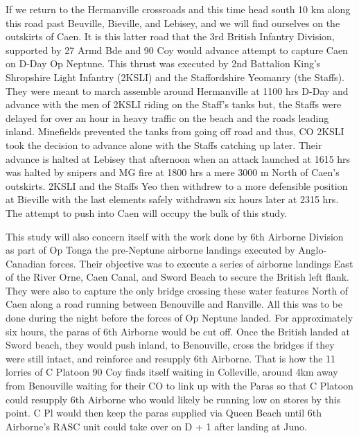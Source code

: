 \documentclass[noraggedright]{turabian-researchpaper}
\begin{document}
If we return to the Hermanville crossroads and this time head south 
10 km along this road past Beuville, Bieville, and Lebisey, and we will find 
ourselves on the outskirts of Caen.  It is this latter road that the 3rd 
British Infantry Division, supported by 27 Armd Bde and 90 Coy would advance
attempt to capture Caen on D-Day Op Neptune.  This thrust was executed by 
2nd Battalion King's Shropshire Light Infantry (2KSLI) and the Staffordshire
Yeomanry (the Staffs).  They were meant to march assemble around Hermanville
at 1100 hrs D-Day and advance with the men of 2KSLI riding on the Staff's 
tanks but, the Staffs were delayed for over an hour in heavy traffic on the
beach and the roads leading inland.  Minefields prevented the tanks from
going off road and thus, CO 2KSLI took the decision to advance alone with the
Staffs catching up later.\autocite[1100 -- 1230 hrs 6 June 1944]{2KSLIwd}
Their advance is halted at Lebisey that afternoon when an attack launched at 
1615 hrs was halted by snipers and MG fire at 1800 hrs a mere 3000 m North of 
Caen's outskirts.  2KSLI and the Staffs Yeo then withdrew to a more 
defensible position at Bieville with the last elements safely withdrawn
six hours later at 2315 hrs.\autocites[6 June 1944]{staffswd}[1630 -- 2315]
{2KSLIwd} The attempt to push into Caen will occupy the bulk of this study.

This study will also concern itself with the work done by 6th Airborne
Division as part of Op Tonga the pre-Neptune airborne landings executed
by Anglo-Canadian forces.  Their objective was to execute a series of
airborne landings East of the River Orne, Caen Canal, and Sword Beach to 
secure the British left flank.  They were also to capture the only bridge 
crossing
these water features North of Caen along a road running between Benouville
and Ranville.  All this was to be done during the night before the forces of
Op Neptune landed.  For approximately six hours, the paras of 6th Airborne
would be cut off.  Once the British landed at Sword beach, they would push
inland, to Benouville, cross the bridges if they were still intact, and
reinforce and resupply 6th Airborne.  That is how the 11 lorries of C Platoon 
90 Coy finds itself waiting in Colleville, around 4km away from Benouville
waiting for their CO to link up with the Paras so that C Platoon could 
resupply 6th Airborne who would likely be running low on stores by this point.
C Pl would then keep the paras supplied via Queen Beach until 6th Airborne's 
RASC unit could take over on D + 1 after landing at Juno.\autocite[1]{90wdjun}
\end{document}

